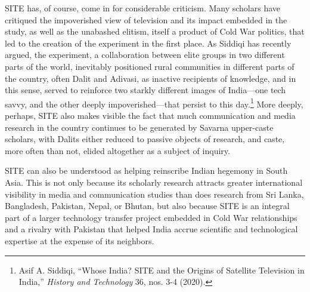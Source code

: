 \documentclass{tufte-handout}
\begin{document}
SITE has, of course, come in for considerable criticism. Many scholars
have critiqued the impoverished view of television and its impact
embedded in the study, as well as the unabashed elitism, itself a
product of Cold War politics, that led to the creation of the experiment
in the first place. As Siddiqi has recently argued, the experiment, a
collaboration between elite groups in two different parts of the world,
inevitably positioned rural communities in different parts of the
country, often Dalit and Adivasi, as inactive recipients of knowledge,
and in this sense, served to reinforce two starkly different images of
India---one tech savvy, and the other deeply impoverished---that persist
to this day.\footnote{Asif A. Siddiqi, ``Whose India? SITE and the
  Origins of Satellite Television in India,'' \emph{History and
  Technology} 36, nos. 3-4 (2020).} More deeply, perhaps, SITE also
makes visible the fact that much communication and media research in the
country continues to be generated by Savarna upper-caste scholars, with
Dalits either reduced to passive objects of research, and caste, more
often than not, elided altogether as a subject of inquiry.

SITE can also be understood as helping reinscribe Indian hegemony in
South Asia. This is not only because its scholarly research attracts
greater international visibility in media and communication studies than
does research from Sri Lanka, Bangladesh, Pakistan, Nepal, or Bhutan,
but also because SITE is an integral part of a larger technology
transfer project embedded in Cold War relationships and a rivalry with
Pakistan that helped India accrue scientific and technological expertise
at the expense of its neighbors.
\end{document}
